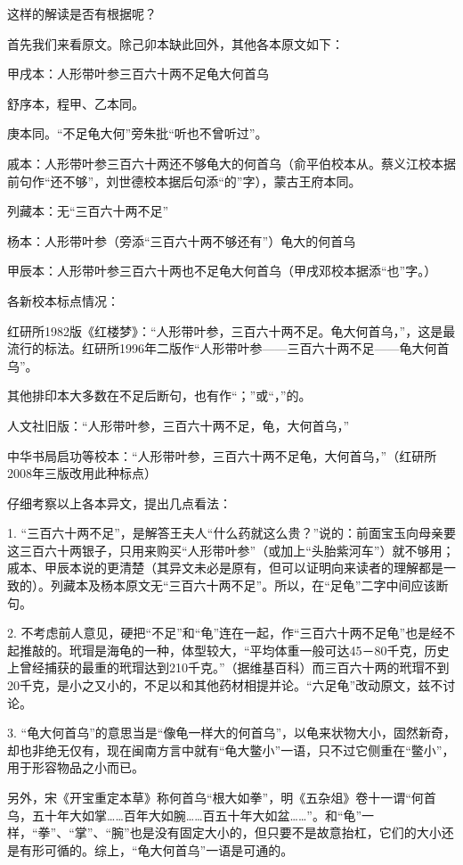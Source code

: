 这样的解读是否有根据呢？

首先我们来看原文。除己卯本缺此回外，其他各本原文如下：

甲戌本：人形带叶参三百六十两不足龟大何首乌

舒序本，程甲、乙本同。

庚本同。“不足龟大何”旁朱批“听也不曾听过”。

戚本：人形带叶参三百六十两还不够龟大的何首乌（俞平伯校本从。蔡义江校本据前句作“还不够”，刘世德校本据后句添“的”字），蒙古王府本同。

列藏本：无“三百六十两不足”

杨本：人形带叶参（旁添“三百六十两不够还有”）龟大的何首乌

甲辰本：人形带叶参三百六十两也不足龟大何首乌（甲戌邓校本据添“也”字。）

各新校本标点情况：

红研所1982版《红楼梦》：“人形带叶参，三百六十两不足。龟大何首乌，”，这是最流行的标法。红研所1996年二版作“人形带叶参------三百六十两不足------龟大何首乌”。

其他排印本大多数在不足后断句，也有作“；”或“，”的。

人文社旧版：“人形带叶参，三百六十两不足，龟，大何首乌，”

中华书局启功等校本：“人形带叶参，三百六十两不足龟，大何首乌，”（红研所2008年三版改用此种标点）

仔细考察以上各本异文，提出几点看法：

1.
“三百六十两不足”，是解答王夫人“什么药就这么贵？”说的：前面宝玉向母亲要这三百六十两银子，只用来购买“人形带叶参”（或加上“头胎紫河车”）就不够用；戚本、甲辰本说的更清楚（其异文未必是原有，但可以证明向来读者的理解都是一致的）。列藏本及杨本原文无“三百六十两不足”。所以，在“足龟”二字中间应该断句。

2.
不考虑前人意见，硬把“不足”和“龟”连在一起，作“三百六十两不足龟”也是经不起推敲的。玳瑁是海龟的一种，体型较大，“平均体重一般可达45－80千克，历史上曾经捕获的最重的玳瑁达到210千克。”（据维基百科）而三百六十两的玳瑁不到20千克，是小之又小的，不足以和其他药材相提并论。“六足龟”改动原文，兹不讨论。

3.
“龟大何首乌”的意思当是“像龟一样大的何首乌”，以龟来状物大小，固然新奇，却也非绝无仅有，现在闽南方言中就有“龟大鳖小”一语，只不过它侧重在“鳖小”，用于形容物品之小而已。

另外，宋《开宝重定本草》称何首乌“根大如拳”，明《五杂俎》卷十一谓“何首乌，五十年大如掌\ldots{}\ldots{}百年大如腕\ldots{}\ldots{}百五十年大如盆\ldots{}\ldots{}”。和“龟”一样，“拳”、“掌”、“腕”也是没有固定大小的，但只要不是故意抬杠，它们的大小还是有形可循的。综上，“龟大何首乌”一语是可通的。

